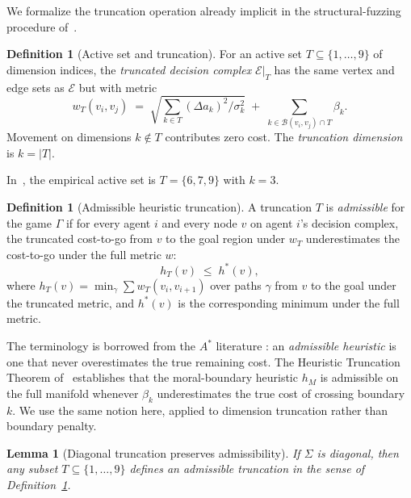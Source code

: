 \documentclass[11pt]{article}
\newtheorem{lemma}[theorem]{Lemma}
\theoremstyle{definition}
\newtheorem{definition}[theorem]{Definition}
\theoremstyle{remark}
\newcommand{\E}{\mathcal{E}}
\begin{document}
We formalize the truncation operation already implicit in the structural-fuzzing procedure
of~\cite{bond2026tcss}.

\begin{definition}[Active set and truncation]
\label{def:truncation}
For an active set $T \subseteq \{1, \ldots, 9\}$ of dimension indices, the \emph{truncated decision
complex} $\E|_T$ has the same vertex and edge sets as $\E$ but with metric
\[
w_T(v_i, v_j) \;=\; \sqrt{\sum_{k \in T} (\Delta a_k)^2 / \sigma_k^2}
                 \;+\; \sum_{k \in \mathcal{B}(v_i, v_j) \cap T} \beta_k.
\]
Movement on dimensions $k \notin T$ contributes zero cost. The \emph{truncation dimension} is
$k = |T|$.
\end{definition}

In~\cite{bond2026tcss}, the empirical active set is $T = \{6, 7, 9\}$ with $k = 3$.

\begin{definition}[Admissible heuristic truncation]
\label{def:admissible}
A truncation $T$ is \emph{admissible} for the game $\Gamma$ if for every agent $i$ and every node $v$
on agent $i$'s decision complex, the truncated cost-to-go from $v$ to the goal region under $w_T$
underestimates the cost-to-go under the full metric $w$:
\begin{equation}
\label{eq:admissible}
h_T(v) \;\leq\; h^*(v),
\end{equation}
where $h_T(v) = \min_\gamma \sum w_T(v_i, v_{i+1})$ over paths $\gamma$ from $v$ to the goal under
the truncated metric, and $h^*(v)$ is the corresponding minimum under the full metric.
\end{definition}

The terminology is borrowed from the $A^*$ literature \cite{hart1968}: an \emph{admissible
heuristic} is one that never overestimates the true remaining cost. The Heuristic Truncation Theorem
of~\cite[Theorem~7]{bond2026geometric} establishes that the moral-boundary heuristic $h_M$ is
admissible on the full manifold whenever $\beta_k$ underestimates the true cost of crossing
boundary $k$. We use the same notion here, applied to dimension truncation rather than boundary
penalty.

\begin{lemma}[Diagonal truncation preserves admissibility]
\label{lem:diagonal}
If $\Sigma$ is diagonal, then any subset $T \subseteq \{1, \ldots, 9\}$ defines an admissible
truncation in the sense of Definition~\ref{def:admissible}.
\end{lemma}
\end{document}

